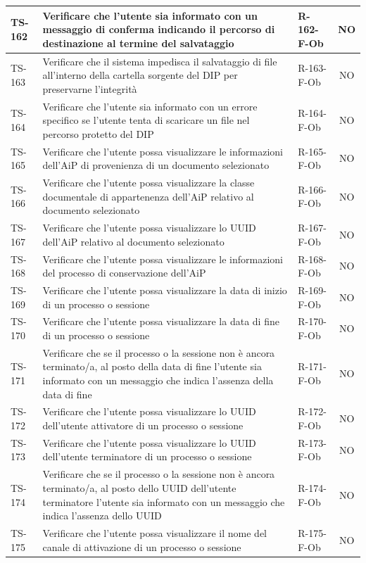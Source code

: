 \documentclass[a4paper,12pt]{article}
\begin{document}
\begin{longtable}{|p{1.5cm}|p{8.3cm}|p{2.4cm}|c|}
\hline
TS-162 & Verificare che l'utente sia informato con un messaggio di conferma indicando il percorso di destinazione al termine del salvataggio & R-162-F-Ob & NO \\
\hline
TS-163 & Verificare che il sistema impedisca il salvataggio di file all'interno della cartella sorgente del DIP per preservarne l'integrità & R-163-F-Ob & NO \\
\hline
TS-164 & Verificare che l'utente sia informato con un errore specifico se l'utente tenta di scaricare un file nel percorso protetto del DIP & R-164-F-Ob & NO \\
\hline
TS-165 & Verificare che l'utente possa visualizzare le informazioni dell'AiP di provenienza di un documento selezionato & R-165-F-Ob & NO \\
\hline
TS-166 & Verificare che l'utente possa visualizzare la classe documentale di appartenenza dell'AiP relativo al documento selezionato & R-166-F-Ob & NO \\
\hline
TS-167 & Verificare che l'utente possa visualizzare lo UUID dell'AiP relativo al documento selezionato & R-167-F-Ob & NO \\
\hline
TS-168 & Verificare che l'utente possa visualizzare le informazioni del processo di conservazione dell'AiP & R-168-F-Ob & NO \\
\hline
TS-169 & Verificare che l'utente possa visualizzare la data di inizio di un processo o sessione & R-169-F-Ob & NO \\
\hline
TS-170 & Verificare che l'utente possa visualizzare la data di fine di un processo o sessione & R-170-F-Ob & NO \\
\hline
TS-171 & Verificare che se il processo o la sessione non è ancora terminato/a, al posto della data di fine l'utente sia informato con un messaggio che indica l'assenza della data di fine & R-171-F-Ob & NO \\
\hline
TS-172 & Verificare che l'utente possa visualizzare lo UUID dell'utente attivatore di un processo o sessione & R-172-F-Ob & NO \\
\hline
TS-173 & Verificare che l'utente possa visualizzare lo UUID dell'utente terminatore di un processo o sessione & R-173-F-Ob & NO \\
\hline
TS-174 & Verificare che se il processo o la sessione non è ancora terminato/a, al posto dello UUID dell'utente terminatore l'utente sia informato con un messaggio che indica l'assenza dello UUID & R-174-F-Ob & NO \\
\hline
TS-175 & Verificare che l'utente possa visualizzare il nome del canale di attivazione di un processo o sessione & R-175-F-Ob & NO \\

\end{longtable}
\end{document}
